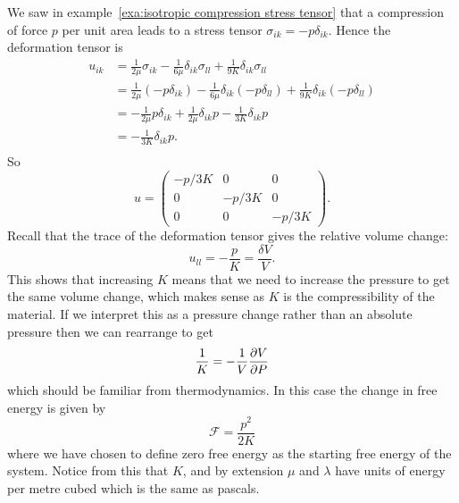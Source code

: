 \documentclass[a4paper]{article}
\newcommand{\freeEnergy}{\mathcal{F}}
\begin{document}
    We saw in example~\ref{exa:isotropic compression stress tensor} that a compression of force \(p\) per unit area leads to a stress tensor \(\sigma_{ik} = -p\delta_{ik}\).
    Hence the deformation tensor is
    \begin{align*}
        u_{ik} &=  \frac{1}{2\mu}\sigma_{ik} - \frac{1}{6\mu}\delta_{ik}\sigma_{ll} + \frac{1}{9K}\delta_{ik}\sigma_{ll}\\
        &= \frac{1}{2\mu}(-p\delta_{ik}) - \frac{1}{6\mu}\delta_{ik}(-p\delta_{ll}) + \frac{1}{9K}\delta_{ik}(-p\delta_{ll})\\
        &= -\frac{1}{2\mu}p\delta_{ik} + \frac{1}{2\mu}\delta_{ik}p - \frac{1}{3K}\delta_{ik}p\\
        &= - \frac{1}{3K}\delta_{ik}p.\\
    \end{align*}
    So
    \[
        u = 
        \begin{pmatrix}
            -p/3K & 0 & 0\\
            0 & -p/3K & 0\\
            0 & 0 & -p/3K
        \end{pmatrix}
        .
    \]
    Recall that the trace of the deformation tensor gives the relative volume change:
    \[u_{ll} = -\frac{p}{K} = \frac{\delta V}{V}.\]
    This shows that increasing \(K\) means that we need to increase the pressure to get the same volume change, which makes sense as \(K\) is the compressibility of the material.
    If we interpret this as a pressure change rather than an absolute pressure then we can rearrange to get
    \[\frac{1}{K} = -\frac{1}{V}\pdv{V}{P}\]
    which should be familiar from thermodynamics.
    In this case the change in free energy is given by
    \[\freeEnergy = \frac{p^2}{2K}\]
    where we have chosen to define zero free energy as the starting free energy of the system.
    Notice from this that \(K\), and by extension \(\mu\) and \(\lambda\) have units of energy per metre cubed which is the same as pascals.
    
\end{document}

